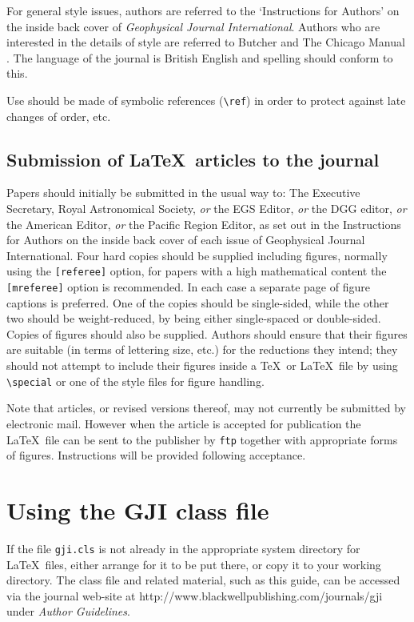 \documentclass{gji}
\begin{document}
For general style issues, authors are referred to the `Instructions for
Authors' on the inside back cover of \textit{Geophysical Journal
International}. Authors
who are interested in the details of style are referred to Butcher
 and The Chicago Manual . The language of
the journal is British English and spelling should conform to this.

Use should be made of symbolic references (\verb"\ref") in order to
protect against late changes of order, etc.

\subsection{Submission of \LaTeX\ articles to the journal}

Papers should initially be submitted in the usual way to:
The Executive Secretary, Royal Astronomical Society, {\em or\/}
the EGS Editor,  {\em or\/} the DGG editor,  {\em or\/}
the American Editor,  {\em or\/} the Pacific Region Editor,
as set out in the Instructions for Authors on the inside back cover of
each issue of Geophysical Journal International.
Four hard copies should be supplied including figures, normally using the
\verb"[referee]" option, for papers with a  high mathematical content the
\verb"[mreferee]" option is recommended. In each case a separate page of
figure captions is preferred.
One of the copies should  be single-sided,
while the other two should  be weight-reduced, by being either
single-spaced or double-sided.   Copies of figures should
also be supplied. Authors should  ensure that their figures are suitable
(in terms of lettering size, etc.)  for the reductions they intend; they
should not attempt to include their figures inside a \TeX\ or \LaTeX\
file by using \verb"\special" or one of the style files for figure
handling.

Note that articles, or revised versions thereof, may not currently be
submitted by electronic mail. However when the article is accepted for
publication the \LaTeX\ file can be sent to the publisher by \verb"ftp"
together with appropriate forms of figures.  Instructions will be provided
following acceptance.

\section{Using the GJI class file}

If the file \verb"gji.cls" is not already in the appropriate
system directory for \LaTeX\ files, either arrange for it to be
put there, or copy it to your working directory. The class file
and related material, such as this guide, can be accessed via the
journal web-site  at
http://www.blackwellpublishing.com/journals/gji under {\em Author
Guidelines}.
\end{document}
